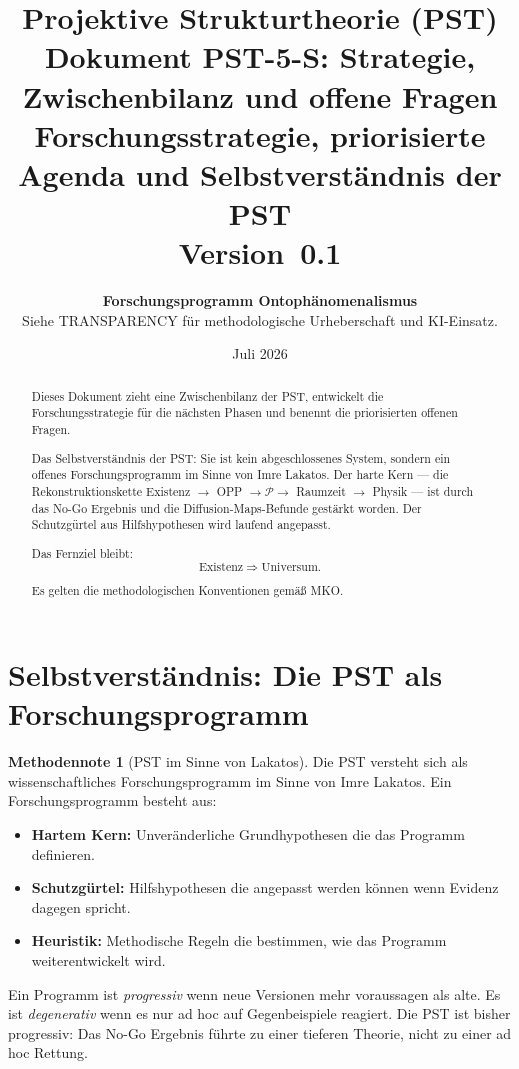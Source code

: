 \documentclass[11pt,a4paper]{article}
\title{
  \textbf{Projektive Strukturtheorie (PST)}\\[0.4em]
  \textbf{Dokument PST-5-S: Strategie, Zwischenbilanz
  und offene Fragen}\\[0.4em]
  {\large Forschungsstrategie, priorisierte Agenda und
  Selbstverst\"{a}ndnis der PST}\\[0.5em]
  {\normalsize Version~0.1}
}
\author{
  \textbf{Forschungsprogramm Ontoph\"{a}nomenalismus}\\
  \small Siehe TRANSPARENCY f\"{u}r methodologische Urheberschaft
  und KI-Einsatz.
}
\date{Juli 2026}
\theoremstyle{plain}
\theoremstyle{definition}
\newtheorem{methodennote}{Methodennote}[section]
\begin{document}
\maketitle

\begin{abstract}
Dieses Dokument zieht eine Zwischenbilanz der PST, entwickelt die
Forschungsstrategie f\"{u}r die n\"{a}chsten Phasen und benennt die
priorisierten offenen Fragen.

Das Selbstverst\"{a}ndnis der PST: Sie ist kein abgeschlossenes System,
sondern ein offenes Forschungsprogramm im Sinne von Imre Lakatos. Der
harte Kern --- die Rekonstruktionskette
Existenz $\rightarrow$ OPP $\rightarrow \mathcal{P} \rightarrow$
Raumzeit $\rightarrow$ Physik --- ist durch das No-Go Ergebnis und die
Diffusion-Maps-Befunde gest\"{a}rkt worden. Der Schutzg\"{u}rtel aus
Hilfs\-hypothesen wird laufend angepasst.

Das Fernziel bleibt:
\[
  \boxed{\text{Existenz} \;\Longrightarrow\; \text{Universum.}}
\]

Es gelten die methodologischen Konventionen gem\"{a}\ss{} MKO.
\end{abstract}

\tableofcontents
\newpage

\section{Selbstverst\"{a}ndnis: Die PST als Forschungsprogramm}

\begin{methodennote}[PST im Sinne von Lakatos]
Die PST versteht sich als wissenschaftliches Forschungsprogramm im Sinne
von Imre Lakatos. Ein Forschungsprogramm besteht aus:
\begin{itemize}
  \item \textbf{Hartem Kern:} Unver\"{a}nderliche Grundhypothesen die
        das Programm definieren.
  \item \textbf{Schutzg\"{u}rtel:} Hilfshypothesen die angepasst werden
        k\"{o}nnen wenn Evidenz dagegen spricht.
  \item \textbf{Heuristik:} Methodische Regeln die bestimmen, wie das
        Programm weiterentwickelt wird.
\end{itemize}
Ein Programm ist \emph{progressiv} wenn neue Versionen mehr voraussagen
als alte. Es ist \emph{degenerativ} wenn es nur ad hoc auf Gegenbeispiele
reagiert. Die PST ist bisher progressiv: Das No-Go Ergebnis f\"{u}hrte
zu einer tieferen Theorie, nicht zu einer ad hoc Rettung.
\end{methodennote}
\end{document}
